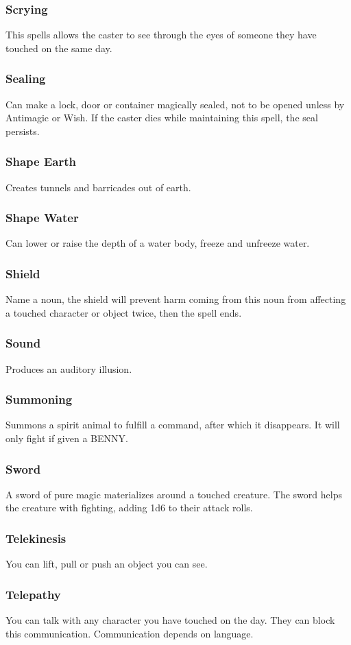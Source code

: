 \begin{multicols}{3}
\subsubsection*{Scrying}
This spells allows the caster to see through the eyes of someone they have touched on the same day.
\subsubsection*{Sealing}
Can make a lock, door or container magically sealed, not to be opened unless by Antimagic or Wish. If the caster dies while maintaining this spell, the seal persists.
\subsubsection*{Shape Earth}
Creates tunnels and barricades out of earth.
\subsubsection*{Shape Water}
Can lower or raise the depth of a water body, freeze and unfreeze water.
\subsubsection*{Shield}
Name a noun, the shield will prevent harm coming from this noun from affecting a touched character or object twice, then the spell ends.
\subsubsection*{Sound}
Produces an auditory illusion.
\subsubsection*{Summoning}
Summons a spirit animal to fulfill a command, after which it disappears. It will only fight if given a BENNY.
\subsubsection*{Sword}
A sword of pure magic materializes around a touched creature. The sword helps the creature with fighting, adding 1d6 to their attack rolls.
\subsubsection*{Telekinesis}
You can lift, pull or push an object you can see.
\subsubsection*{Telepathy}
You can talk with any character you have touched on the day. They can block this communication. Communication depends on language.

\end{multicols}
